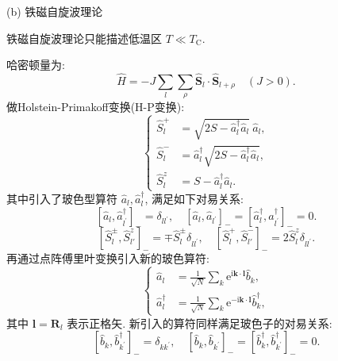 (b) 铁磁自旋波理论

铁磁自旋波理论只能描述低温区 $T\ll T_\mathrm{C}$.

哈密顿量为:
\begin{equation}
\hat{H}=-J \sum_{l} \sum_{\rho} \hat{\boldsymbol{S}}_{l} \cdot \hat{\boldsymbol{S}}_{l+\rho} \quad(J>0).
\end{equation}
做Holstein-Primakoff变换(H-P变换): 
\begin{equation}
\left\{\begin{aligned}
\hat{S}_{l}^{+}&=\sqrt{2 S-\hat{a}^{\dagger}_{l} \hat{a}^{}_{l}} ~\hat{a}^{}_{l} ,\\ 
\hat{S}_{l}^{-}&=\hat{a}_{l}^{\dagger} \sqrt{2 S-\hat{a}_{l}^{\dagger} \hat{a}^{}_{l}} ,\\ 
\hat{S}_{l}^{z}&=S-\hat{a}_{l}^{\dagger} \hat{a}^{}_{l}.
\end{aligned}\right.
\end{equation}
其中引入了玻色型算符 $\hat{a}^{}_{l}, \hat{a}_{l}^{\dagger}$, 满足如下对易关系:
\begin{equation}
\left[\hat{a}_{l}^{}, \hat{a}_{l^{\prime}}^{\dagger}\right]_{-}=\delta_{l l^{\prime}}, \quad\left[\hat{a}_{l}, \hat{a}_{l^{\prime}}\right]_{-}=\left[\hat{a}_{l}^{\dagger}, \hat{a}_{l^{\prime}}^{\dagger}\right]_{-}=0.
\end{equation}
\begin{equation}
\left[\hat{S}_{l}^{\pm} ,\hat{S}_{l'}^{z} \right]_{-}=\mp\hat{S}_{l}^{\pm}\delta_{l l^{\prime}}^{},\quad
\left[\hat{S}_{l}^{+} ,\hat{S}_{l'}^{-} \right]_{-}=2\hat{S}_{l}^{z}\delta_{l l^{\prime}}^{}.
\end{equation}
再通过点阵傅里叶变换引入新的玻色算符:
\begin{equation}
\left\{\begin{aligned}
\displaystyle \hat{a}_{l}&=\frac{1}{\sqrt{N}} \sum_{ k} \mathrm{e}^{\mathrm{i} \boldsymbol {k} \cdot \boldsymbol {l}} \hat{b}_{k} ,\\
\displaystyle \hat{a}_{l}^{\dagger}&=\frac{1}{\sqrt{N}} \sum_{ k} \mathrm{e}^{-\mathrm{i} \boldsymbol {k} \cdot \boldsymbol {l}} \hat{b}_{k}^{\dagger},
\end{aligned}\right.
\end{equation}
其中 $\boldsymbol{l}=\boldsymbol{R}_{l}$ 表示正格矢. 新引入的算符同样满足玻色子的对易关系:
\begin{equation}
\left[\hat{b}^{}_{k}, \hat{b}_{k^{\prime}}^{\dagger}\right]_{-}=\delta_{k k^{\prime}}, \quad\left[\hat{b}_{k}, \hat{b}_{k^{\prime}}\right]_{-}=\left[\hat{b}_{k}^{\dagger}, \hat{b}_{k^{\prime}}^{\dagger}\right]_{-}=0.
\end{equation}
